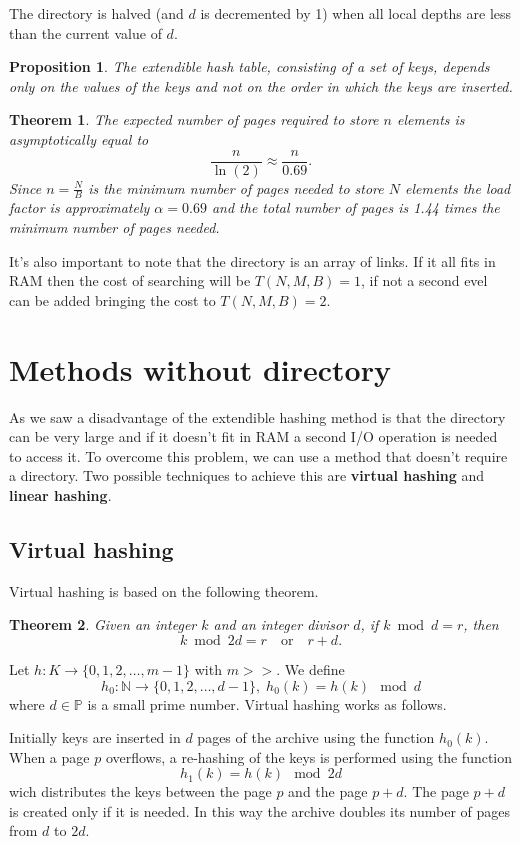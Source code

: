 \documentclass{report}
\newtheorem{prop}{Proposition}[chapter]
\newtheorem{teo}{Theorem}[chapter]
\begin{document}
The directory is halved (and $d$ is decremented by 1) when all local depths are less than the current value of $d$.
\begin{prop}
    The extendible hash table, consisting of a set of keys, depends only on the values of the keys and not on the order in which the keys are inserted.
\end{prop}
\begin{teo}
    The expected number of pages required to store $n$ elements is asymptotically equal to
    \begin{equation}
    \frac{n}{\ln(2)} \approx \frac{n}{0.69}.
    \end{equation}
    Since \(n = \frac{N}{B}\) is the minimum number of pages needed to store \(N\) elements the load factor is approximately \(\alpha = 0.69\) and the total number of pages is 1.44 times the minimum number of pages needed.
\end{teo}
It's also important to note that the directory is an array of links. If it all fits in RAM then the cost of searching will be \(T(N,M,B) = 1\), if not a second evel can be added bringing the cost to \(T(N,M,B) = 2\).
\section*{Methods without directory}
As we saw a disadvantage of the extendible hashing method is that the directory can be very large and if it doesn't fit in RAM a second I/O operation is needed to access it. To overcome this problem, we can use a method that doesn't require a directory. Two possible techniques to achieve this are \textbf{virtual hashing} and \textbf{linear hashing}.
\subsection{Virtual hashing}
Virtual hashing is based on the following theorem.
\begin{teo}
    Given an integer $k$ and an integer divisor $d$, if $k \bmod d = r$, then
    \begin{equation}
        k \bmod 2d = r \quad \text{or} \quad r + d.
    \end{equation}
\end{teo}
\noindent
Let \(h: K \to \{0,1,2,\dots,m-1\}\) with \(m>>\). We define
\begin{equation}
    h_0 : \mathbb{N} \to \{0,1,2,\dots,d-1\}, \; h_0(k) = h(k) \mod d
\end{equation}
where \(d \in \mathbb{P}\) is a small prime number. Virtual hashing works as follows.

Initially keys are inserted in \(d\) pages of the archive using the function \(h_0(k)\). When a page \(p\) overflows, a re-hashing of the keys is performed using the function
\begin{equation}
    h_1(k) = h(k) \mod 2d
\end{equation}
wich distributes the keys between the page \(p\) and the page \(p+d\). The page \(p+d\) is created only if it is needed. In this way the archive doubles its number of pages from \(d\) to \(2d\).
\end{document}
